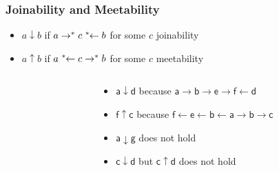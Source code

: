 \documentclass[12pt,aspectratio=169]{beamer}
\newcommand{\m}[1]{\mathsf{#1}}
\begin{document}
\begin{frame}
    \frametitle{Joinability and Meetability}
    \begin{definition}
        \begin{itemize}
                \pause
            \item \alert{$a \downarrow b$} if $a \rightarrow^* c \;\reflectbox{$\rightarrow^*$}\; b$ for some $c$ \hfill \alert{joinability}
                \pause
            \item \alert{$a \uparrow b$} if $a \;\reflectbox{$\rightarrow^*$}\; c \rightarrow^* b$ for some $c$ \hfill \alert{meetability}
        \end{itemize}
    \end{definition}
\pause
    \begin{example}
    \begin{columns}
        \begin{column}{0.35\textwidth}
            \centering
            \fig
        \end{column}
        \begin{column}{0.5\textwidth}
            \begin{itemize}
                \pause
                \item $\m{a} \downarrow \m{d}$ \pause because $\m{a} \rightarrow \m{b} \rightarrow \m{e} \rightarrow \m{f} \leftarrow \m{d}$
                \pause
                \item $\m{f} \uparrow \m{c}$ \pause because $\m{f} \leftarrow \m{e} \leftarrow \m{b} \leftarrow \m{a} \rightarrow \m{b} \rightarrow \m{c}$
                \pause
                \item $\m{a} \downarrow \m{g}$ \pause does not hold
                \pause
                \item $\m{c} \downarrow \m{d}$ \pause but $\m{c} \uparrow \m{d}$ does not hold
            \end{itemize}
        \end{column}
        \end{columns}
    \end{example}
\end{frame}
\end{document}
